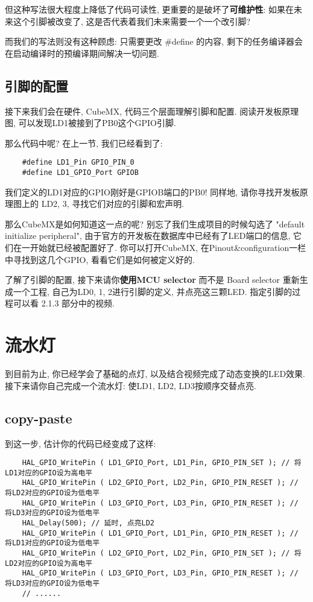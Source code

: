但这种写法很大程度上降低了代码可读性, 更重要的是破坏了\textbf{可维护性}: 如果在未来这个引脚被改变了, 这是否代表着我们未来需要一个一个改引脚?

而我们的写法则没有这种顾虑: 只需要更改 \#define 的内容, 剩下的任务编译器会在启动编译时的预编译期间解决一切问题.

\subsection{引脚的配置}

接下来我们会在硬件, CubeMX, 代码三个层面理解引脚和配置. 阅读开发板原理图, 可以发现LD1被接到了PB0这个GPIO引脚.

那么代码中呢? 在上一节, 我们已经看到了:
\begin{lstlisting}
	#define LD1_Pin GPIO_PIN_0
	#define LD1_GPIO_Port GPIOB
\end{lstlisting}

我们定义的LD1对应的GPIO刚好是GPIOB端口的PB0! 同样地, 请你寻找开发板原理图上的 LD2, 3, 寻找它们对应的引脚和宏声明.

那么CubeMX是如何知道这一点的呢? 别忘了我们生成项目的时候勾选了 "default initialize peripheral", 由于官方的开发板在数据库中已经有了LED端口的信息, 它们在一开始就已经被配置好了. 你可以打开CubeMX, 在Pinout\&configuration一栏中寻找到这几个GPIO, 看看它们是如何被定义好的.

\begin{theorem}
	了解了引脚的配置, 接下来请你\textbf{使用MCU selector} 而不是 Board selector 重新生成一个工程, 自己为LD0, 1, 2进行引脚的定义, 并点亮这三颗LED. 指定引脚的过程可以看 2.1.3 部分中的视频.
\end{theorem}

\section{流水灯}

到目前为止, 你已经学会了基础的点灯, 以及结合视频完成了动态变换的LED效果. 接下来请你自己完成一个流水灯: 使LD1, LD2, LD3按顺序交替点亮.

\subsection{copy-paste}

到这一步, 估计你的代码已经变成了这样:
\begin{lstlisting}
	HAL_GPIO_WritePin ( LD1_GPIO_Port, LD1_Pin, GPIO_PIN_SET ); // 将LD1对应的GPIO设为高电平
	HAL_GPIO_WritePin ( LD2_GPIO_Port, LD2_Pin, GPIO_PIN_RESET ); // 将LD2对应的GPIO设为低电平
	HAL_GPIO_WritePin ( LD3_GPIO_Port, LD3_Pin, GPIO_PIN_RESET ); // 将LD3对应的GPIO设为低电平
	HAL_Delay(500); // 延时, 点亮LD2
	HAL_GPIO_WritePin ( LD1_GPIO_Port, LD1_Pin, GPIO_PIN_RESET ); // 将LD1对应的GPIO设为低电平
	HAL_GPIO_WritePin ( LD2_GPIO_Port, LD2_Pin, GPIO_PIN_SET ); // 将LD2对应的GPIO设为高电平
	HAL_GPIO_WritePin ( LD3_GPIO_Port, LD3_Pin, GPIO_PIN_RESET ); // 将LD3对应的GPIO设为低电平
	// ......
\end{lstlisting}

